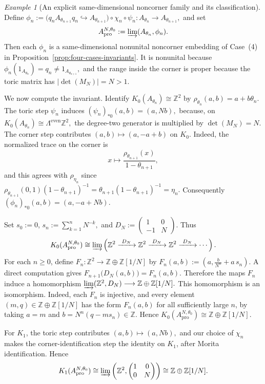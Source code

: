 \documentclass[11pt]{amsart}
\theoremstyle{definition}
\theoremstyle{remark}
\newtheorem{example}[theorem]{Example}
\newcommand{\Z}{\mathbb{Z}}
\newcommand{\ex}{\mathrm{pro}}
\begin{document}
\begin{example}[An explicit same-dimensional noncorner family and its classification]
Define $\phi_n:=\bigl(q_nA_{\theta_{n+1}}q_n\hookrightarrow A_{\theta_{n+1}}\bigr)
\circ\chi_n\circ\psi_n
\colon
A_{\theta_n}\longrightarrow A_{\theta_{n+1}},$
and set
\[
A_{\ex}^{N,\theta_0}
:=
\varinjlim(A_{\theta_n},\phi_n).
\]
Then each $\phi_n$ is a same-dimensional nonunital noncorner embedding of
Case~\textup{(4)} in Proposition~\ref{prop:four-cases-invariants}. It is
nonunital because $\phi_n(1_{A_{\theta_n}})=q_n\neq 1_{A_{\theta_{n+1}}},$
and the range inside the corner is proper because the toric matrix has $|\det(M_N)|=N>1.$

We now compute the invariant. Identify $K_0(A_{\theta_n})\cong\Z^2$
by $\rho_{\theta_n}(a,b)=a+b\theta_n.$
The toric step $\psi_n$ induces $(\psi_n)_{*0}(a,b)=(a,Nb),$
because, on $K_0(A_{\theta_n})\cong\Lambda^{\mathrm{even}}\Z^2,$
the degree-two generator is multiplied by $\det(M_N)=N.$
The corner step contributes $(a,b)\longmapsto(a,-a+b)$
on $K_0$. Indeed, the normalized trace on the corner is
\[
x\longmapsto
\frac{\rho_{\theta_{n+1}}(x)}{1-\theta_{n+1}},
\]
and this agrees with $\rho_{\eta_n}$ since
$\rho_{\theta_{n+1}}(0,1)(1-\theta_{n+1})^{-1}
=
{\theta_{n+1}}(1-\theta_{n+1})^{-1}
=
\eta_n.$ Consequently $(\phi_n)_{*0}(a,b)=(a,-a+Nb).$

Set $s_0:=0$, $s_n:=\sum_{k=1}^nN^{-k},$ and $D_N:=
\begin{pmatrix}
1&0\\
-1&N
\end{pmatrix}.$
Thus
\[
K_0(A_{\ex}^{N,\theta_0})
\cong
\varinjlim
\left(
\Z^2\xrightarrow{\ D_N\ }\Z^2\xrightarrow{\ D_N\ }\Z^2
\xrightarrow{\ D_N\ }\cdots
\right).
\]
For each $n\geq0$, define
$F_n\colon\Z^2\longrightarrow \Z\oplus\Z[1/N]$
by $F_n(a,b):=
\left(a,\frac{b}{N^n}+a\,s_n\right).$
A direct computation gives $F_{n+1}\bigl(D_N(a,b)\bigr)=F_n(a,b).$ Therefore the maps $F_n$ induce a homomorphism $\varinjlim(\Z^2,D_N)\longrightarrow \Z\oplus\Z[1/N].$
This homomorphism is an isomorphism. Indeed, each $F_n$ is injective, and
every element $(m,q)\in\Z\oplus\Z[1/N]$ has the form $F_n(a,b)$ for all
sufficiently large $n$, by taking $a=m$ and  $b=N^n(q-ms_n)\in\Z.$ Hence $K_0(A_{\ex}^{N,\theta_0})\cong\Z\oplus\Z[1/N].$

For $K_1$, the toric step contributes $(a,b)\longmapsto(a,Nb),$
and our choice of $\chi_n$ makes the corner-identification step the identity
on $K_1$, after Morita identification. Hence
\[
K_1(A_{\ex}^{N,\theta_0})
\cong
\varinjlim
\left(
\Z^2,
\begin{pmatrix}
1&0\\
0&N
\end{pmatrix}
\right)
\cong
\Z\oplus\Z[1/N].
\]


\end{example}
\end{document}
